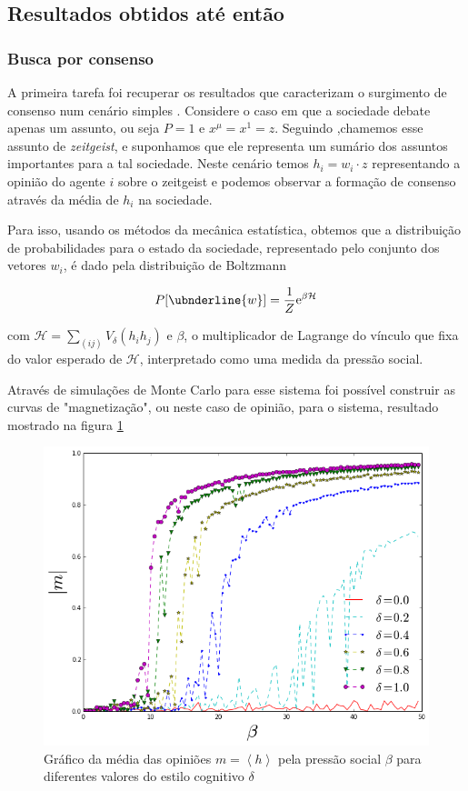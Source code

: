 \documentclass[11pt]{article}
\begin{document}
\subsection{Resultados obtidos até então}

\subsubsection{Busca por consenso}

A primeira tarefa foi recuperar os resultados que caracterizam o
surgimento de consenso num cenário simples \cite{visujeca, Jonatas}.
Considere o caso em
que a sociedade debate apenas um assunto, ou seja $P=1$ e $x^{\mu} = x^1 = z$.
Seguindo \cite{CaVi},chamemos esse assunto de {\it zeitgeist}, e suponhamos que
ele representa um sumário dos assuntos importantes para a tal sociedade. Neste
cenário temos $h_i = w_i \cdot z$ representando a opinião do agente $i$ sobre o
zeitgeist e podemos observar a formação de consenso através da média de $h_i$ na
sociedade.

Para isso, usando os métodos da mecânica estatística, obtemos que a distribuição
de probabilidades para o estado da sociedade, representado pelo conjunto dos
vetores $w_i$, é dado pela distribuição de Boltzmann

\[P[\ubnderline{w}]=\frac{1}{Z}\mathrm{e}^{\beta \mathcal{H}}\]

com $\mathcal{H}=\sum_{(ij)} V_{\delta}(h_ih_j)$ e $\beta$, o multiplicador de
Lagrange do vínculo que fixa do valor esperado de $\mathcal{H}$, interpretado
como uma medida da pressão social.

Através de simulações de Monte Carlo para esse sistema foi possível construir as
curvas de "magnetização", ou neste caso de opinião, para o sistema, resultado
mostrado na figura \ref{m-b-d}  

\begin{figure}[h!]
  \centering
      \includegraphics[width=1.0\textwidth]{mag-beta-delta.png}
  \caption{Gráfico da média das opiniões $m=\left<h\right>$ pela pressão social
      $\beta$ para diferentes valores do estilo cognitivo $\delta$}
    \label{m-b-d}
\end{figure}
\end{document}
